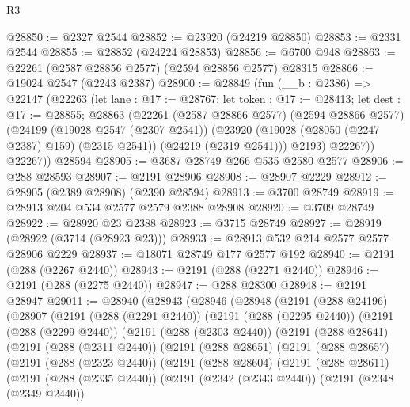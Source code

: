 \begin{lexlean}{R3}
\begin{coremodule}
@28850 := @2327 @2544
@28852 := @23920 (@24219 @28850)
@28853 := @2331 @2544
@28855 := @28852 (@24224 @28853)
@28856 := @6700 @948
@28863 := @22261 (@2587 @28856 @2577) (@2594 @28856 @2577) @28315
@28866 := @19024 @2547 (@2243 @2387)
@28900 := @28849
    (fun (__b : @2386) =>
    @22147
      (@22263
        (let lane : @17 := @28767;
        let token : @17 := @28413;
        let dest : @17 := @28855;
        @28863
          (@22261
            (@2587 @28866 @2577)
            (@2594 @28866 @2577)
            (@24199
              (@19028 @2547 (@2307 @2541))
              (@23920 (@19028 (@28050 (@2247 @2387) @159) (@2315 @2541)) (@24219 (@2319 @2541)))
              @2193)
            @22267))
        @22267))
    @28594
@28905 := @3687 @28749 @266 @535 @2580 @2577
@28906 := @288 @28593
@28907 := @2191 @28906
@28908 := @28907 @2229
@28912 := @28905 (@2389 @28908) (@2390 @28594)
@28913 := @3700 @28749
@28919 := @28913 @204 @534 @2577 @2579 @2388 @28908
@28920 := @3709 @28749
@28922 := @28920 @23 @2388
@28923 := @3715 @28749
@28927 := @28919 (@28922 (@3714 (@28923 @23)))
@28933 := @28913 @532 @214 @2577 @2577 @28906 @2229
@28937 := @18071 @28749 @177 @2577 @192
@28940 := @2191 (@288 (@2267 @2440))
@28943 := @2191 (@288 (@2271 @2440))
@28946 := @2191 (@288 (@2275 @2440))
@28947 := @288 @28300
@28948 := @2191 @28947
@29011 := @28940
    (@28943
      (@28946
        (@28948
          (@2191
            (@288 @24196)
            (@28907
              (@2191
                (@288 (@2291 @2440))
                (@2191
                  (@288 (@2295 @2440))
                  (@2191
                    (@288 (@2299 @2440))
                    (@2191
                      (@288 (@2303 @2440))
                      (@2191
                        (@288 @28641)
                        (@2191
                          (@288 (@2311 @2440))
                          (@2191
                            (@288 @28651)
                            (@2191
                              (@288 @28657)
                              (@2191
                                (@288 (@2323 @2440))
                                (@2191
                                  (@288 @28604)
                                  (@2191
                                    (@288 @28611)
                                    (@2191
                                      (@288 (@2335 @2440))
                                      (@2191
                                        (@2342 (@2343 @2440))
                                        (@2191
                                          (@2348 (@2349 @2440))

\end{coremodule}
\end{lexlean}
